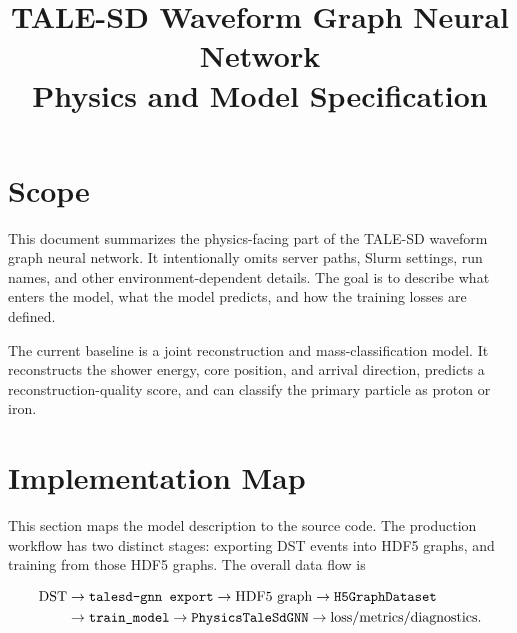\documentclass[a4paper,10pt]{article}
\title{TALE-SD Waveform Graph Neural Network\\
Physics and Model Specification}
\author{}
\date{}
\newcommand{\code}[1]{\ifmmode\text{\ttfamily #1}\else\texttt{#1}\fi}
\begin{document}
\maketitle
\vspace{-7mm}

\section{Scope}

This document summarizes the physics-facing part of the TALE-SD waveform graph neural network.
It intentionally omits server paths, Slurm settings, run names, and other environment-dependent details.
The goal is to describe what enters the model, what the model predicts, and how the training losses are defined.

The current baseline is a joint reconstruction and mass-classification model.
It reconstructs the shower energy, core position, and arrival direction, predicts a reconstruction-quality score, and can classify the primary particle as proton or iron.

\section{Implementation Map}

This section maps the model description to the source code.
The production workflow has two distinct stages: exporting DST events into HDF5 graphs, and training from those HDF5 graphs.
The overall data flow is
\begin{footnotesize}
\[
\begin{aligned}
\mathrm{DST}
&\rightarrow
\code{talesd-gnn export}
\rightarrow
\mathrm{HDF5\ graph}
\rightarrow
\code{H5GraphDataset}
\\
&\rightarrow
\code{train\_model}
\rightarrow
\code{PhysicsTaleSdGNN}
\rightarrow
\mathrm{loss/metrics/diagnostics}.
\end{aligned}
\]
\end{footnotesize}
\end{document}
